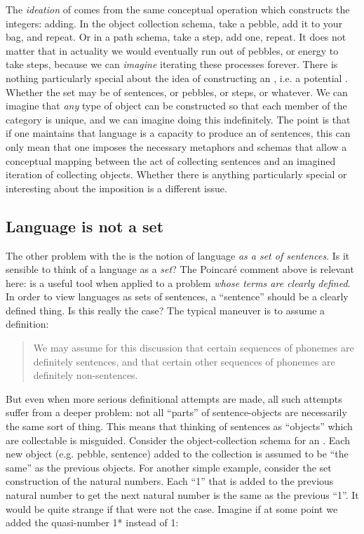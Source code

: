   The \textit{ideation} of  comes from the same conceptual operation which constructs the integers: adding. In the object collection schema, take a pebble, add it to your bag, and repeat. Or in a path schema, take a step, add one, repeat. It does not matter that in actuality we would eventually run out of pebbles, or energy to take steps, because we can \textit{imagine} iterating these processes forever. There is nothing particularly special about the idea of constructing an , i.e. a potential . Whether the set may be of sentences, or pebbles, or steps, or whatever. We can imagine that \textit{any} type of object can be constructed so that each member of the category is unique, and we can imagine doing this indefinitely. The point is that if one maintains that language is a capacity to produce an  of sentences, this can only mean that one imposes the necessary metaphors and schemas that allow a conceptual mapping between the act of collecting sentences and an imagined iteration of collecting objects. Whether there is anything particularly special or interesting about the imposition is a different issue.

\subsection{Language is not a set}

The other problem with the  is the notion of language \textit{as a set of sentences}. Is it sensible to think of a language as a \textit{set}? The Poincaré comment above is relevant here:  is a useful tool when applied to a problem \textit{whose terms are clearly defined}. In order to view languages as sets of sentences, a “sentence” should be a clearly defined thing. Is this really the case? The typical maneuver is to assume a definition:

\begin{quote}
We may assume for this discussion that certain sequences of phonemes are definitely sentences, and that certain other sequences of phonemes are definitely non-sentences. \citep[14]{Chomsky1957}
\end{quote}

  But even when more serious definitional attempts are made, all such attempts suffer from a deeper problem: not all “parts” of sentence-objects are necessarily the same sort of thing. This means that thinking of sentences as “objects” which are collectable is misguided. Consider the object-collection schema for an . Each new object (e.g. pebble, sentence) added to the collection is assumed to be “the same” as the previous objects. For another simple example, consider the set construction of the natural numbers. Each “1” that is added to the previous natural number to get the next natural number is the same as the previous “1”. It would be quite strange if that were not the case. Imagine if at some point we added the quasi-number 1* instead of 1:

